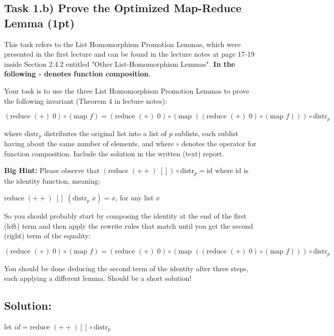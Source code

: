 \documentclass{article}
\begin{document}
\subsection{Task 1.b) Prove the Optimized Map-Reduce Lemma (1pt)}

This task refers to the List Homomorphism Promotion Lemmas, which were presented in the first lecture and can be found in the lecture notes at page 17-19 inside Section 2.4.2 entitled "Other List-Homomorphism Lemmas".   \textbf{In the following $\circ$ denotes function composition}.

Your task is to use the three List Homomorphism Promotion Lemmas to prove the following invariant (Theorem 4 in lecture notes):

\begin{equation*}
(\text{reduce } (+) \; 0) \circ (\text{map } f) = (\text{reduce } (+) \; 0) \circ (\text{map } ( (\text{reduce } (+) \; 0) \circ (\text{map } f) ) ) \circ \text{distr}_p
\end{equation*}

where $\text{distr}_p$  distributes the original list into a list of $p$ sublists, each sublist having about the same number of elements, and where $\circ$ denotes the operator for function composition.   Include the solution in the written (text) report. 

\textbf{Big Hint:} Please observe that  $(\text{reduce } (++) \; []) \circ \text{distr}_p = \text{id}$ where $\text{id}$ is the identity function, meaning:

$\text{reduce } (++) \; [] \; (\text{distr}_p \; x) = x$, for any list $x$

So you should probably start by composing the identity at the end of the first (left) term and then apply the rewrite rules that match until you get the second (right) term of the equality:

$(\text{reduce } (+) \; 0) \circ (\text{map } f) = (\text{reduce } (+) \; 0) \circ (\text{map } ( (\text{reduce } (+) \; 0) \circ (\text{map } f) ) ) \circ \text{distr}_p$

You should be done deducing the second term of the identity after three steps, each applying a different lemma. Should be a short solution!

\subsection*{Solution:}

let $id = \text{reduce } (++)[] \circ \text{distr}_p$
\end{document}
